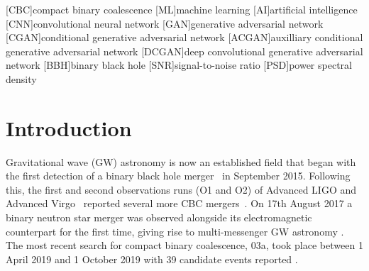 \documentclass[12pt]{iopart}
\begin{document}
[CBC]{compact binary coalescence} 
[ML]{machine learning}
[AI]{artificial intelligence}
[CNN]{convolutional neural network}
[GAN]{generative adversarial network}
[CGAN]{conditional generative adversarial network}
[ACGAN]{auxilliary conditional generative adversarial network}
[DCGAN]{deep convolutional generative adversarial network}
[BBH]{binary black hole}
[SNR]{signal-to-noise ratio}
[PSD]{power spectral density}


\section{Introduction}

%
Gravitational wave (GW) astronomy is now an established field that began with the first detection of a binary black hole merger~\cite{Abbott2016} in September 2015. Following this, the first and second observations runs (O1 and O2) of Advanced LIGO and Advanced Virgo~\cite{Prospects-dets, AdvLIGO, AdvLIGO2, AdvVIRGO} reported several more \ac{CBC} mergers~\cite{Abbott2016a, Abbott2017, Abbott2017a}. On 17th August 2017 a binary neutron star merger was observed alongside its electromagnetic counterpart for the first time, giving rise to multi-messenger GW astronomy \cite{Abbott2017b}. The most recent search for compact binary coalescence, 03a, took place between 1 April 2019 and 1 October 2019 with 39 candidate events reported \cite{GWTC2:2020}.  
\end{document}
